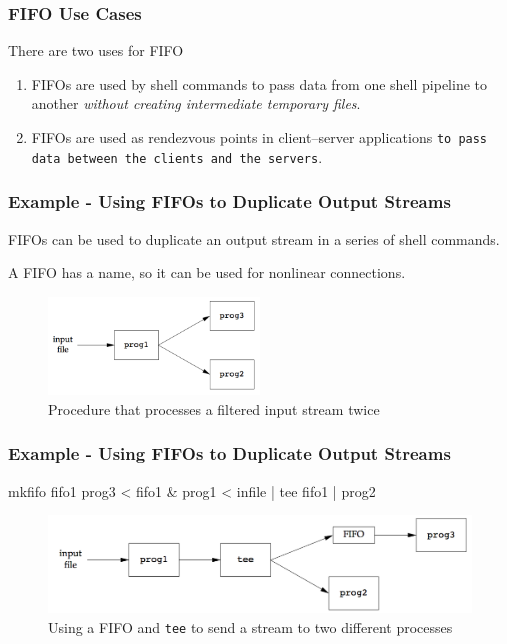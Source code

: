 \documentclass[newPxFont,sthlmFooter,nooffset]{beamer}
\begin{document}
\begin{frame}[t]
  \frametitle{FIFO Use Cases}
There are two uses for FIFO
\begin{enumerate}
\item FIFOs are used by shell commands to pass data from one shell pipeline to another \textit{without creating intermediate temporary files}.
\item FIFOs are used as rendezvous points in client–server applications \texttt{to pass data between the clients and the servers}.
\end{enumerate}

\end{frame}



\begin{frame}[t]
  \frametitle{Example - Using FIFOs to Duplicate Output Streams}

FIFOs can be used to duplicate an output stream in a series of shell commands.

A FIFO has a name, so it can be used for nonlinear connections.
  \begin{figure}[h]
    \centering
    \includegraphics[width=0.5\textwidth]{figures/fig15_20-procedure.png}
    \caption{Procedure that processes a filtered input stream twice}
  \end{figure}


\end{frame}



\begin{frame}[t,fragile]
  \frametitle{Example - Using FIFOs to Duplicate Output Streams}
\begin{codedefnb}
mkfifo fifo1
prog3 < fifo1 &
prog1 < infile | tee fifo1 | prog2
\end{codedefnb}
  \begin{figure}[h]
    \centering
    \includegraphics[width=1\textwidth]{figures/fig15_21-using.png}
    \caption{Using a FIFO and \texttt{tee} to send a stream to two different processes}
  \end{figure}

\end{frame}
\end{document}
